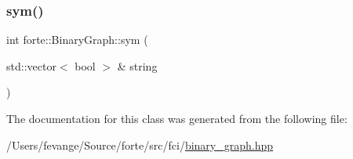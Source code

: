 \subsubsection{\texorpdfstring{sym()}{sym()}\hspace{0.1cm}{\footnotesize\ttfamily [2/2]}}
{\footnotesize\ttfamily int forte\+::\+Binary\+Graph\+::sym (\begin{DoxyParamCaption}\item[{std\+::vector$<$ bool $>$ \&}]{string }\end{DoxyParamCaption})\hspace{0.3cm}{\ttfamily [inline]}}



The documentation for this class was generated from the following file\+:\begin{DoxyCompactItemize}
\item 
/\+Users/fevange/\+Source/forte/src/fci/\mbox{\hyperlink{binary__graph_8hpp}{binary\+\_\+graph.\+hpp}}\end{DoxyCompactItemize}

